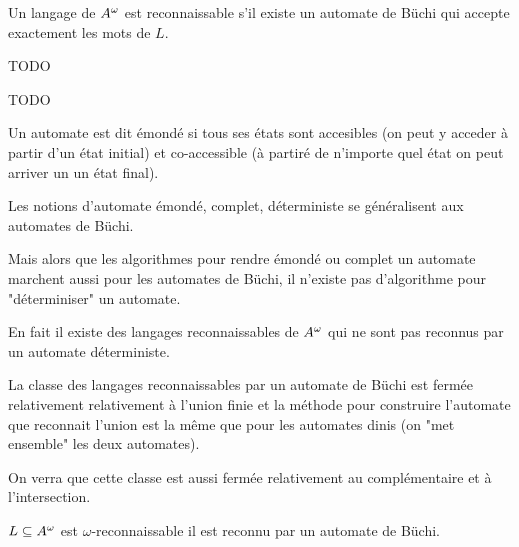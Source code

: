 \begin{definition}
	Un langage de $A^{\omega}$ est reconnaissable s'il existe un automate de Büchi qui accepte exactement les mots de $L$.
\end{definition}


\begin{exemple}
	TODO
\end{exemple}


\begin{exercice}
	TODO
\end{exercice}


\begin{definition}
	Un automate est dit émondé si tous ses états sont accesibles (on peut y acceder à partir d'un état initial)
	et co-accessible (à partiré de n'importe quel état on peut arriver un un état final).
\end{definition}

Les notions d'automate émondé, complet, déterministe se généralisent aux automates de Büchi.


Mais alors que les algorithmes pour rendre émondé ou complet un automate marchent aussi
pour les automates de Büchi, il n'existe pas d'algorithme pour "déterminiser" un automate.

En fait il existe des langages reconnaissables de $A^{\omega}$ qui ne sont pas reconnus par un automate déterministe.



La classe des langages reconnaissables par un automate de Büchi est fermée relativement relativement à l'union finie
et la méthode pour construire l'automate que reconnait l'union est la même que pour les automates dinis (on "met ensemble"
les deux automates).

On verra que cette classe est aussi fermée relativement au complémentaire et à l'intersection.


\begin{theorem}
	$L \subseteq A^{\omega}$ est $\omega$-reconnaissable \ssi il est reconnu par un automate de Büchi.
\end{theorem}

